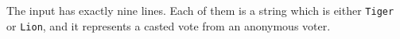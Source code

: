 The input has exactly nine lines.
Each of them is a string which is either \verb+Tiger+ or \verb+Lion+,
and it represents a casted vote from an anonymous voter.

